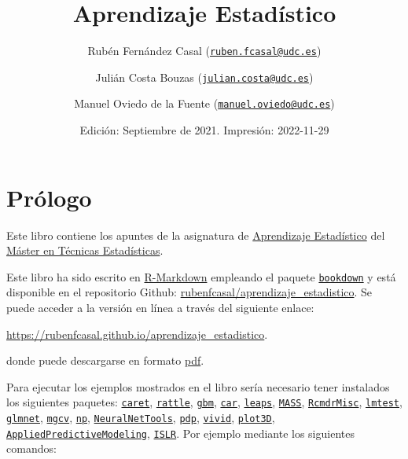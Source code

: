 \documentclass[
  spanish,
]{book}
\title{Aprendizaje Estadístico}
\author{Rubén Fernández Casal (\href{mailto:ruben.fcasal@udc.es}{\nolinkurl{ruben.fcasal@udc.es}}) \and Julián Costa Bouzas (\href{mailto:julian.costa@udc.es}{\nolinkurl{julian.costa@udc.es}}) \and Manuel Oviedo de la Fuente (\href{mailto:manuel.oviedo@udc.es}{\nolinkurl{manuel.oviedo@udc.es}})}
\date{Edición: Septiembre de 2021. Impresión: 2022-11-29}
\theoremstyle{break}
\theoremstyle{definition}
\theoremstyle{definition}
\theoremstyle{definition}
\theoremstyle{definition}
\theoremstyle{remark}
\begin{document}
\maketitle

{
\setcounter{tocdepth}{1}
\tableofcontents
}
\hypertarget{pruxf3logo}{%
\chapter*{Prólogo}\label{pruxf3logo}}

Este libro contiene los apuntes de la asignatura de \href{http://eamo.usc.es/pub/mte/index.php?option=com_content\&view=article\&id=74}{Aprendizaje Estadístico} del \href{http://eio.usc.es/pub/mte}{Máster en Técnicas Estadísticas}.

Este libro ha sido escrito en \href{http://rmarkdown.rstudio.com}{R-Markdown} empleando el paquete \href{https://bookdown.org/yihui/bookdown/}{\texttt{bookdown}} y está disponible en el repositorio Github: \href{https://github.com/rubenfcasal/aprendizaje_estadistico}{rubenfcasal/aprendizaje\_estadistico}.
Se puede acceder a la versión en línea a través del siguiente enlace:

\url{https://rubenfcasal.github.io/aprendizaje_estadistico}.

donde puede descargarse en formato \href{https://rubenfcasal.github.io/aprendizaje_estadistico/aprendizaje_estadistico.pdf}{pdf}.

Para ejecutar los ejemplos mostrados en el libro sería necesario tener instalados los siguientes paquetes:
\href{https://CRAN.R-project.org/package=caret}{\texttt{caret}}, \href{https://CRAN.R-project.org/package=rattle}{\texttt{rattle}}, \href{https://CRAN.R-project.org/package=gbm}{\texttt{gbm}}, \href{https://CRAN.R-project.org/package=car}{\texttt{car}}, \href{https://CRAN.R-project.org/package=leaps}{\texttt{leaps}}, \href{https://CRAN.R-project.org/package=MASS}{\texttt{MASS}}, \href{https://CRAN.R-project.org/package=RcmdrMisc}{\texttt{RcmdrMisc}}, \href{https://CRAN.R-project.org/package=lmtest}{\texttt{lmtest}}, \href{https://CRAN.R-project.org/package=glmnet}{\texttt{glmnet}}, \href{https://CRAN.R-project.org/package=mgcv}{\texttt{mgcv}}, \href{https://CRAN.R-project.org/package=np}{\texttt{np}}, \href{https://CRAN.R-project.org/package=NeuralNetTools}{\texttt{NeuralNetTools}}, \href{https://CRAN.R-project.org/package=pdp}{\texttt{pdp}}, \href{https://CRAN.R-project.org/package=vivid}{\texttt{vivid}}, \href{https://CRAN.R-project.org/package=plot3D}{\texttt{plot3D}}, \href{https://CRAN.R-project.org/package=AppliedPredictiveModeling}{\texttt{AppliedPredictiveModeling}}, \href{https://CRAN.R-project.org/package=ISLR}{\texttt{ISLR}}.
Por ejemplo mediante los siguientes comandos:
\end{document}
